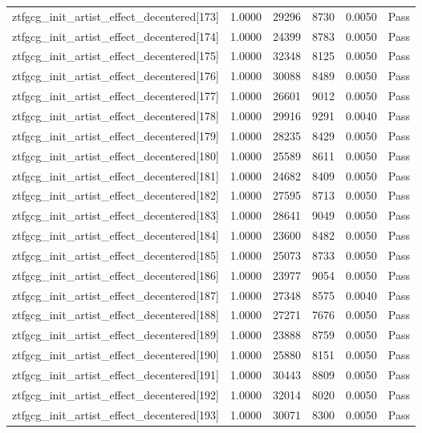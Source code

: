 \begin{table}[htbp]
\begin{tabular}{llrrll}
ztfgcg\_init\_artist\_effect\_decentered[173] & 1.0000 & 29296 & 8730 & 0.0050 & Pass \\
ztfgcg\_init\_artist\_effect\_decentered[174] & 1.0000 & 24399 & 8783 & 0.0050 & Pass \\
ztfgcg\_init\_artist\_effect\_decentered[175] & 1.0000 & 32348 & 8125 & 0.0050 & Pass \\
ztfgcg\_init\_artist\_effect\_decentered[176] & 1.0000 & 30088 & 8489 & 0.0050 & Pass \\
ztfgcg\_init\_artist\_effect\_decentered[177] & 1.0000 & 26601 & 9012 & 0.0050 & Pass \\
ztfgcg\_init\_artist\_effect\_decentered[178] & 1.0000 & 29916 & 9291 & 0.0040 & Pass \\
ztfgcg\_init\_artist\_effect\_decentered[179] & 1.0000 & 28235 & 8429 & 0.0050 & Pass \\
ztfgcg\_init\_artist\_effect\_decentered[180] & 1.0000 & 25589 & 8611 & 0.0050 & Pass \\
ztfgcg\_init\_artist\_effect\_decentered[181] & 1.0000 & 24682 & 8409 & 0.0050 & Pass \\
ztfgcg\_init\_artist\_effect\_decentered[182] & 1.0000 & 27595 & 8713 & 0.0050 & Pass \\
ztfgcg\_init\_artist\_effect\_decentered[183] & 1.0000 & 28641 & 9049 & 0.0050 & Pass \\
ztfgcg\_init\_artist\_effect\_decentered[184] & 1.0000 & 23600 & 8482 & 0.0050 & Pass \\
ztfgcg\_init\_artist\_effect\_decentered[185] & 1.0000 & 25073 & 8733 & 0.0050 & Pass \\
ztfgcg\_init\_artist\_effect\_decentered[186] & 1.0000 & 23977 & 9054 & 0.0050 & Pass \\
ztfgcg\_init\_artist\_effect\_decentered[187] & 1.0000 & 27348 & 8575 & 0.0040 & Pass \\
ztfgcg\_init\_artist\_effect\_decentered[188] & 1.0000 & 27271 & 7676 & 0.0050 & Pass \\
ztfgcg\_init\_artist\_effect\_decentered[189] & 1.0000 & 23888 & 8759 & 0.0050 & Pass \\
ztfgcg\_init\_artist\_effect\_decentered[190] & 1.0000 & 25880 & 8151 & 0.0050 & Pass \\
ztfgcg\_init\_artist\_effect\_decentered[191] & 1.0000 & 30443 & 8809 & 0.0050 & Pass \\
ztfgcg\_init\_artist\_effect\_decentered[192] & 1.0000 & 32014 & 8020 & 0.0050 & Pass \\
ztfgcg\_init\_artist\_effect\_decentered[193] & 1.0000 & 30071 & 8300 & 0.0050 & Pass \\

\end{tabular}
\end{table}
